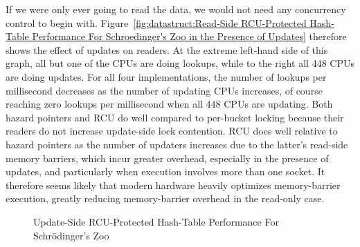 If we were only ever going to read the data, we would not need any
concurrency control to begin with.
Figure~\ref{fig:datastruct:Read-Side RCU-Protected Hash-Table Performance For Schroedinger's Zoo in the Presence of Updates}
therefore shows the effect of updates on readers.
At the extreme left-hand side of this graph, all but one of the CPUs
are doing lookups, while to the right all 448 CPUs are doing updates.
For all four implementations, the number of lookups per millisecond
decreases as the number of updating CPUs increases, of course reaching
zero lookups per millisecond when all 448 CPUs are updating.
Both hazard pointers and RCU do well compared to per-bucket locking
because their readers do not increase update-side lock contention.
RCU does well relative to hazard pointers as the number of updaters
increases due to the latter's read-side memory barriers, which incur
greater overhead, especially in the presence of updates, and particularly
when execution involves more than one socket.
It therefore seems likely that modern hardware heavily optimizes memory-barrier
execution, greatly reducing memory-barrier overhead in the read-only case.

\begin{figure}[tb]
\centering
{}
\caption{Update-Side RCU-Protected Hash-Table Performance For Schr\"odinger's Zoo}
\label{fig:datastruct:Update-Side RCU-Protected Hash-Table Performance For Schroedinger's Zoo}
\end{figure}

